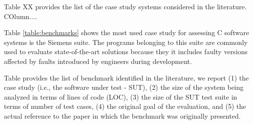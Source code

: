


Table XX provides the list of the case study systems considered in the literature. COlumn....


Table \ref{table:benchmarks} shows the most used case study for assessing C software systems is the Siemens suite.
The programs belonging to this suite are commonly used to evaluate state-of-the-art solutions because they it includes faulty versions affected by faults introduced by engineers during development.


Table provides the list of benchmark identified in the literature, we report (1) the case study (i.e., the software under test - SUT), (2) the size of the system being analyzed in terms of lines of code (LOC), (3) the size of the SUT test suite in terms of number of test cases, (4) the original goal of the evaluation, and (5) the actual reference to the paper in which the benchmark was originally presented. 


